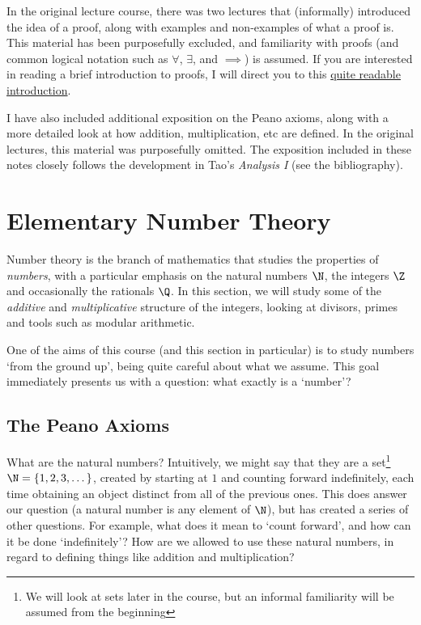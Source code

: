 \documentclass[a4paper]{scrreprt}
\begin{document}
In the original lecture course, there was two lectures that (informally) introduced the idea of a proof, along with examples and non-examples of what a proof is. This material has been purposefully excluded, and familiarity with proofs (and common logical notation such as $\forall$, $\exists$, and $\implies$) is assumed. 
If you are interested in reading a brief introduction to proofs, I will direct you to this \href{https://math.berkeley.edu/~hutching/teach/proofs.pdf}{quite readable introduction}.

I have also included additional exposition on the Peano axioms, along with a more detailed look at how addition, multiplication, etc are defined. In the original lectures, this material was purposefully omitted. The exposition included in these notes closely follows the development in Tao's \emph{Analysis I} (see the bibliography).

\clearpage


\chapter{Elementary Number Theory}

Number theory is the branch of mathematics that studies the properties of \emph{numbers}, with a particular emphasis on the natural numbers $\N$, the integers $\Z$ and occasionally the rationals $\Q$. In this section, we will study some of the \emph{additive} and \emph{multiplicative} structure of the integers, looking at divisors, primes and tools such as modular arithmetic. 

One of the aims of this course (and this section in particular) is to study numbers `from the ground up', being quite careful about what we assume. This goal immediately presents us with a question: what exactly is a `number'?


\section{The Peano Axioms}

What are the natural numbers? Intuitively, we might say that they are a set\footnote{We will look at sets later in the course, but an informal familiarity will be assumed from the beginning} $\N = \{1, 2, 3, \dots\}$, created by starting at $1$ and counting forward indefinitely, each time obtaining an object distinct from all of the previous ones.
	This does answer our question (a natural number is any element of $\N$), but has created a series of other questions. For example, what does it mean to `count forward', and how can it be done `indefinitely'? How are we allowed to use these natural numbers, in regard to defining things like addition and multiplication? 
	
\end{document}

